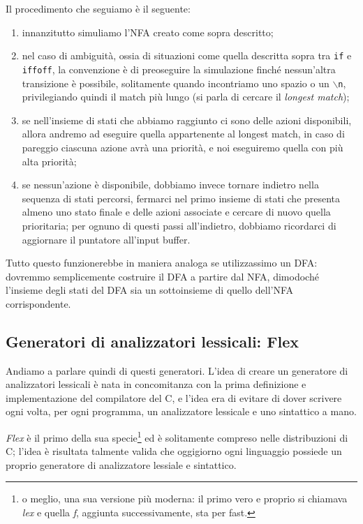 \documentclass[class=book, crop=false, oneside, 12pt]{standalone}
\begin{document}
Il procedimento che seguiamo è il seguente:
\begin{enumerate}
    \item innanzitutto simuliamo l'NFA creato come sopra descritto;
    \item nel caso di ambiguità, ossia di situazioni come quella descritta sopra tra \texttt{if} e \texttt{iffoff}, la convenzione è di preoseguire la simulazione finché nessun’altra transizione è possibile, solitamente quando incontriamo uno spazio o un \texttt{\(\backslash\)n}, privilegiando quindi il match più lungo (si parla di cercare il \emph{longest match});
    \item se nell'insieme di stati che abbiamo raggiunto ci sono delle azioni disponibili, allora andremo ad eseguire quella appartenente al longest match, in caso di pareggio ciascuna azione avrà una priorità, e noi eseguiremo quella con più alta priorità;
    \item se nessun'azione è disponibile, dobbiamo invece tornare indietro nella sequenza di stati percorsi, fermarci nel primo insieme di stati che presenta almeno uno stato finale e delle azioni associate e cercare di nuovo quella prioritaria; per ognuno di questi passi all'indietro, dobbiamo ricordarci di aggiornare il puntatore all'input buffer.
\end{enumerate}

Tutto questo funzionerebbe in maniera analoga se utilizzassimo un DFA: dovremmo semplicemente costruire il DFA a partire dal NFA, dimodoché l'insieme degli stati del DFA sia un sottoinsieme di quello dell'NFA corrispondente.

\subsection{Generatori di analizzatori lessicali: Flex}
Andiamo a parlare quindi di questi generatori. L'idea di creare un generatore di analizzatori lessicali è nata in concomitanza con la prima definizione e implementazione del compilatore del C, e l'idea era di evitare di dover scrivere ogni volta, per ogni programma, un analizzatore lessicale e uno sintattico a mano.

\emph{Flex} è il primo della sua specie\footnote{o meglio, una sua versione più moderna: il primo vero e proprio si chiamava \emph{lex} e quella \emph{f}, aggiunta successivamente, sta per fast.} ed è solitamente compreso nelle distribuzioni di C; l'idea è risultata talmente valida che oggigiorno ogni linguaggio possiede un proprio generatore di analizzatore lessiale e sintattico.
\end{document}
